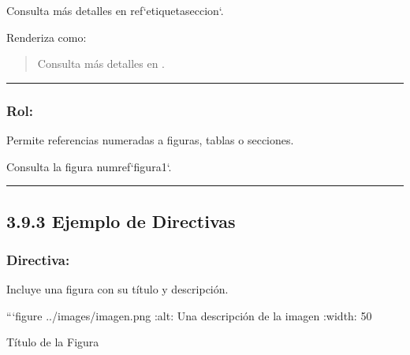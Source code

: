 \documentclass[a4paper,10pt,spanish]{sphinxmanual}
\begin{document}
\begin{sphinxVerbatim}[commandchars=\\\{\}]
Consulta más detalles en \PYGZob{}ref\PYGZcb{}`etiqueta\PYGZhy{}seccion`.
\end{sphinxVerbatim}

\sphinxAtStartPar
Renderiza como:
\begin{quote}

\sphinxAtStartPar
Consulta más detalles en .
\end{quote}


\bigskip\hrule\bigskip



\subsubsection{Rol: }
\label{\detokenize{3_guia_myst/roles:rol-numref}}
\sphinxAtStartPar
Permite referencias numeradas a figuras, tablas o secciones.

\begin{sphinxVerbatim}[commandchars=\\\{\}]
Consulta la figura \PYGZob{}numref\PYGZcb{}`figura\PYGZhy{}1`.
\end{sphinxVerbatim}


\bigskip\hrule\bigskip



\subsection{3.9.3 Ejemplo de Directivas}
\label{\detokenize{3_guia_myst/roles:ejemplo-de-directivas}}

\subsubsection{Directiva: }
\label{\detokenize{3_guia_myst/roles:directiva-figure}}
\sphinxAtStartPar
Incluye una figura con su título y descripción.

\begin{sphinxVerbatim}[commandchars=\\\{\}]
```\PYGZob{}figure\PYGZcb{} ../images/imagen.png
:alt: Una descripción de la imagen
:width: 50\PYGZpc{}

Título de la Figura
\end{sphinxVerbatim}
\end{document}
